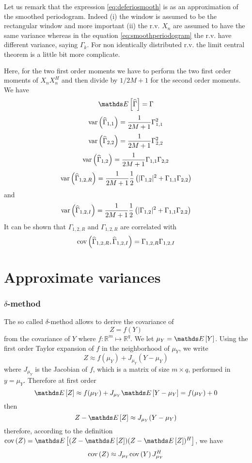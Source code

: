 \begin{remark}
Let us remark that the expression \eqref{eq:deferiosmooth} is as an approximation of the smoothed periodogram. Indeed (i) the window is assumed to be the rectangular window and more important (ii) the r.v. $X_{n}$ are assumed to have the same variance whereas in the equation \eqref{eq:smoothperiodogram} the r.v. have different variance, saying $\Gamma_{k}$. For non identically distributed r.v. the limit central theorem is a little bit more complicate.
\end{remark}
Here, for the two first order moments we have to perform the two first order moments of $X_{n}X_{n}^{H}$ and then divide by $1/2M+1$ for the second order moments. We have
$$
 \esp{\hat \Gamma}=\Gamma
$$
$$
 \mathrm{var}\left( \widehat\Gamma_{1,1} \right)=\frac{1}{2M+1}\Gamma_{1,1}^{2}
$$
$$
 \mathrm{var}\left( \widehat\Gamma_{2,2} \right)=\frac{1}{2M+1}\Gamma_{2,2}^{2}
$$
$$
 \mathrm{var}\left( \widehat\Gamma_{1,2} \right)=\frac{1}{2M+1}\Gamma_{1,1}\Gamma_{2,2}
$$
$$
 \mathrm{var}\left( \widehat\Gamma_{1,2,R} \right)=\frac{1}{2M+1}\frac{1}{2}
  \left( |\Gamma_{1,2}|^{2}+\Gamma_{1,1}\Gamma_{2,2}
  \right)
$$
and
$$
 \mathrm{var}\left( \widehat\Gamma_{1,2,I} \right)=\frac{1}{2M+1}\frac{1}{2}
  \left( |\Gamma_{1,2}|^{2}+\Gamma_{1,1}\Gamma_{2,2}
  \right)
$$
It can be shown that $\Gamma_{1,2,R}$ and $\Gamma_{1,2,R}$ are correlated with
$$
 \mathrm{cov}\left( \widehat\Gamma_{1,2,R},\widehat\Gamma_{1,2,I} \right)=\Gamma_{1,2,R}\Gamma_{1,2,I}
$$


\section{Approximate variances}
\label{ss:varianceexpressions}
\subsubsection{$\delta$-method}

The so called $\delta$-method allows to derive the covariance of 
$$
 Z = f(Y)
$$
from the covariance of $Y$ where $f:\mathds{R}^{m}\mapsto \mathds{R}^{q}$. 
We let $\mu_{Y}=\esp{Y}$. Using the first order Taylor expansion of $f$ in the neighborhood  of $\mu_{Y}$, we write
$$
 Z \approx f(\mu_{Y}) + J_{\mu_{Y}}(Y-\mu_{Y})
$$
where $J_{\mu_{Y}}$ is the Jacobian of $f$, which is a matrix of size $m\times q$, performed in $y=\mu_{Y}$.
Therefore at first order
$$
 \esp{Z} \approx f(\mu_{Y}) + J_{\mu_{Y}}\esp{Y-\mu_{Y}}=f(\mu_{Y})+0
$$
then
$$
 Z-\esp{Z}\approx J_{\mu_{Y}}(Y-\mu_{Y})
$$
therefore, according to the definition $\cov{Z} = \esp{(Z-\esp{Z})(Z-\esp{Z})^{H}}$, we have
$$
 \mathrm{cov}\left( Z \right) \approx 
 J_{\mu_{Y}}\mathrm{cov}\left( Y \right)J_{\mu_{Y}}^{H}
$$

